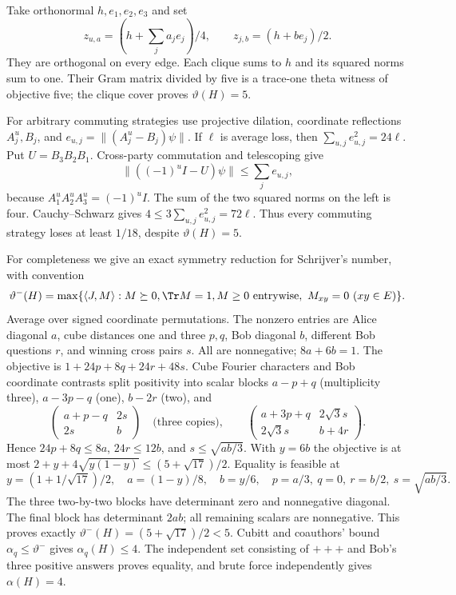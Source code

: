 Take orthonormal $h,e_1,e_2,e_3$ and set
\[
 z_{u,a}=(h+\sum_ja_je_j)/4,\qquad z_{j,b}=(h+be_j)/2.
\]
They are orthogonal on every edge. Each clique sums to $h$ and its
squared norms sum to one. Their Gram matrix divided by five is a
trace-one theta witness of objective five; the clique cover proves
$\vartheta(H)=5$.

For arbitrary commuting strategies use projective dilation, coordinate
reflections $A_j^u,B_j$, and
$e_{u,j}=\|(A_j^u-B_j)\psi\|$. If $\ell$ is average loss, then
$\sum_{u,j}e_{u,j}^2=24\ell$. Put $U=B_3B_2B_1$.
Cross-party commutation and telescoping give
\[
 \|((-1)^uI-U)\psi\|\le\sum_j e_{u,j},
\]
because $A_1^uA_2^uA_3^u=(-1)^uI$.
The sum of the two squared norms on the left is four. Cauchy--Schwarz
gives $4\le3\sum_{u,j}e_{u,j}^2=72\ell$. Thus every commuting
strategy loses at least $1/18$, despite $\vartheta(H)=5$.

For completeness we give an exact symmetry reduction for Schrijver's
number, with convention
\[
 \vartheta^-(H)=\max\{\langle J,M\rangle:M\succeq0,\Tr M=1,
                          M\ge0\text{ entrywise},\ M_{xy}=0\ (xy\in E)\}.
\]
Average over signed coordinate permutations. The nonzero entries are
Alice diagonal $a$, cube distances one and three $p,q$, Bob diagonal
$b$, different Bob questions $r$, and winning cross pairs $s$.
All are nonnegative; $8a+6b=1$. The objective is
$1+24p+8q+24r+48s$. Cube Fourier characters and Bob coordinate contrasts
split positivity into scalar blocks $a-p+q$ (multiplicity three),
$a-3p-q$ (one), $b-2r$ (two), and
\[
 \begin{pmatrix}a+p-q&2s\\2s&b\end{pmatrix}
 \quad\text{(three copies)},\qquad
 \begin{pmatrix}a+3p+q&2\sqrt3s\\2\sqrt3s&b+4r\end{pmatrix}.
\]
Hence $24p+8q\le8a$, $24r\le12b$, and
$s\le\sqrt{ab/3}$. With $y=6b$ the objective is at most
$2+y+4\sqrt{y(1-y)}\le(5+\sqrt{17})/2$.
Equality is feasible at
\[
 y=(1+1/\sqrt{17})/2,\quad a=(1-y)/8,\quad b=y/6,
 \quad p=a/3,\ q=0,\ r=b/2,\ s=\sqrt{ab/3}.
\]
The three two-by-two blocks have determinant zero and nonnegative
diagonal. The final block has determinant $2ab$; all remaining scalars
are nonnegative. This proves exactly
$\vartheta^-(H)=(5+\sqrt{17})/2<5$.
Cubitt and coauthors' bound $\alpha_q\le\vartheta^-$
\cite{CMRSSW} gives $\alpha_q(H)\le4$. The independent set consisting
of $+++$ and Bob's three positive answers proves equality, and brute
force independently gives $\alpha(H)=4$.

